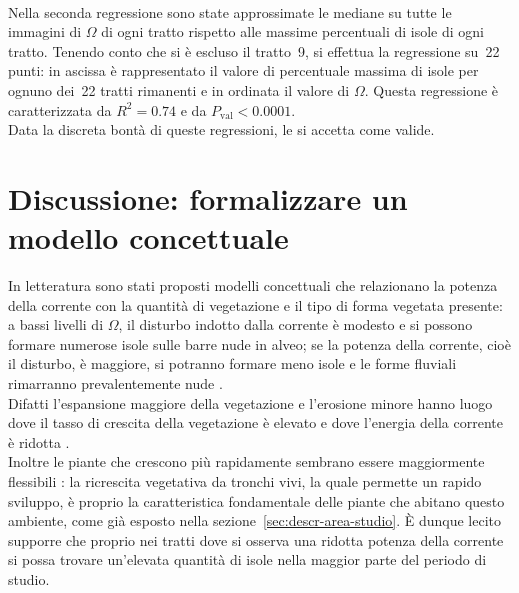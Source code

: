 \\
Nella seconda regressione sono state approssimate le mediane su tutte le immagini di $\Omega$ di ogni tratto rispetto alle massime percentuali di isole di ogni tratto. Tenendo conto che si è escluso il tratto~9, si effettua la regressione su~22 punti: in ascissa è rappresentato il valore di percentuale massima di isole per ognuno dei~22 tratti rimanenti e in ordinata il valore di $\Omega$.
Questa regressione è caratterizzata da $R^2 = 0.74$ e da $P_\mathrm{val} < 0.0001$.
\\
Data la discreta bontà di queste regressioni, le si accetta come valide.

\section{Discussione: formalizzare un modello concettuale}
In letteratura sono stati proposti modelli concettuali che relazionano la potenza della corrente con la quantità di vegetazione e il tipo di forma vegetata presente:
a bassi livelli di $\Omega$, il disturbo indotto dalla corrente è modesto e si possono formare numerose isole sulle barre nude in alveo;
se la potenza della corrente, cioè il disturbo, è maggiore, si potranno formare meno isole e le forme fluviali rimarranno prevalentemente nude .
\\
Difatti l'espansione maggiore della vegetazione e l'erosione minore hanno luogo dove il tasso di crescita della vegetazione è elevato e dove l'energia della corrente è ridotta .
\\
Inoltre le piante che crescono più rapidamente sembrano essere maggiormente flessibili : la ricrescita vegetativa da tronchi vivi, la quale permette un rapido sviluppo, è proprio la caratteristica fondamentale delle piante che abitano questo ambiente, come già esposto nella sezione~\ref{sec:descr-area-studio}.
È dunque lecito supporre che proprio nei tratti dove si osserva una ridotta potenza della corrente si possa trovare un'elevata quantità di isole nella maggior parte del periodo di studio.

